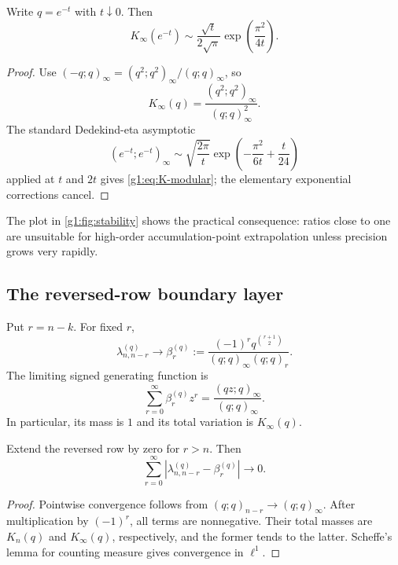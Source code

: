 \begin{theorem}
Write $q=e^{-t}$ with $t\downarrow0$.  Then
\begin{equation}
 K_\infty(e^{-t})
 \sim\frac{\sqrt t}{2\sqrt\pi}
 \exp\!\left(\frac{\pi^2}{4t}\right).
 \label{g1:eq:K-modular}
\end{equation}
\end{theorem}

\begin{proof}
Use
$(-q;q)_\infty=(q^2;q^2)_\infty/(q;q)_\infty$, so
\[
 K_\infty(q)=\frac{(q^2;q^2)_\infty}{(q;q)_\infty^2}.
\]
The standard Dedekind-eta asymptotic
\[
 (e^{-t};e^{-t})_\infty
 \sim\sqrt{\frac{2\pi}{t}}
 \exp\!\left(-\frac{\pi^2}{6t}+\frac{t}{24}\right)
\]
applied at $t$ and $2t$ gives \eqref{g1:eq:K-modular}; the elementary exponential
corrections cancel.
\end{proof}

The plot in \cref{g1:fig:stability} shows the practical consequence: ratios close
to one are unsuitable for high-order accumulation-point extrapolation unless
precision grows very rapidly.

\subsection{The reversed-row boundary layer}

Put $r=n-k$.  For fixed $r$,
\begin{equation}
 \lambda_{n,n-r}^{(q)}\longrightarrow
 \beta_r^{(q)}:=
 \frac{(-1)^rq^{\binom{r+1}{2}}}{(q;q)_\infty(q;q)_r}.
 \label{g1:eq:beta}
\end{equation}
The limiting signed generating function is
\begin{equation}
 \sum_{r=0}^{\infty}\beta_r^{(q)}z^r
 =\frac{(qz;q)_\infty}{(q;q)_\infty}.
 \label{g1:eq:beta-generating}
\end{equation}
In particular, its mass is $1$ and its total variation is $K_\infty(q)$.

\begin{theorem}
Extend the reversed row by zero for $r>n$.  Then
\begin{equation}
 \sum_{r=0}^{\infty}
 \left|\lambda_{n,n-r}^{(q)}-\beta_r^{(q)}\right|
 \longrightarrow0.
 \label{g1:eq:l1-boundary}
\end{equation}
\end{theorem}

\begin{proof}
Pointwise convergence follows from $(q;q)_{n-r}\to(q;q)_\infty$.  After
multiplication by $(-1)^r$, all terms are nonnegative.  Their total masses are
$K_n(q)$ and $K_\infty(q)$, respectively, and the former tends to the latter.
Scheffe's lemma for counting measure gives convergence in $\ell^1$.
\end{proof}

